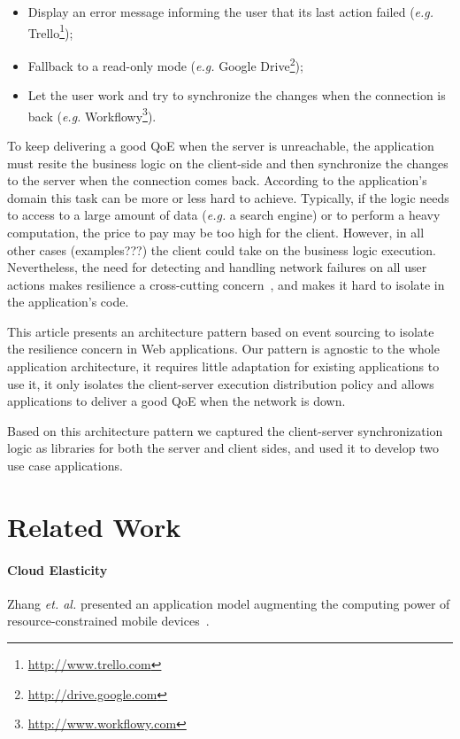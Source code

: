 \documentclass{llncs}
\begin{document}
\begin{itemize}
 \item Display an error message informing the user that its last action failed (\textit{e.g.} Trello\footnote{\href{http://www.trello.com}{http://www.trello.com}});
 \item Fallback to a read-only mode (\textit{e.g.} Google Drive\footnote{\href{http://drive.google.com}{http://drive.google.com}});
 \item Let the user work and try to synchronize the changes when the connection is back (\textit{e.g.} Workflowy\footnote{\href{http://www.workflowy.com}{http://www.workflowy.com}}).
\end{itemize}

To keep delivering a good QoE when the server is unreachable, the application must resite the business logic on the client-side and then synchronize the changes to the server when the connection comes back. According to the application's domain this task can be more or less hard to achieve. Typically, if the logic needs to access to a large amount of data (\emph{e.g.} a search engine) or to perform a heavy computation, the price to pay may be too high for the client. However, in all other cases (examples???) the client could take on the business logic execution. Nevertheless, the need for detecting and handling network failures on all user actions makes resilience a cross-cutting concern~\cite{Kiczales97_AOP}, and makes it hard to isolate in the application's code.

This article presents an architecture pattern based on event sourcing to isolate the resilience concern in Web applications. Our pattern is agnostic to the whole application architecture, it requires little adaptation for existing applications to use it, it only isolates the client-server execution distribution policy and allows applications to deliver a good QoE when the network is down.

Based on this architecture pattern we captured the client-server synchronization logic as libraries for both the server and client sides, and used it to develop two use case applications.

\section{Related Work}

\paragraph{Cloud Elasticity} Zhang \emph{et. al.} presented an application model augmenting the computing power of resource-constrained mobile devices~\cite{Zhang10_ElasticMobile}.
\end{document}
